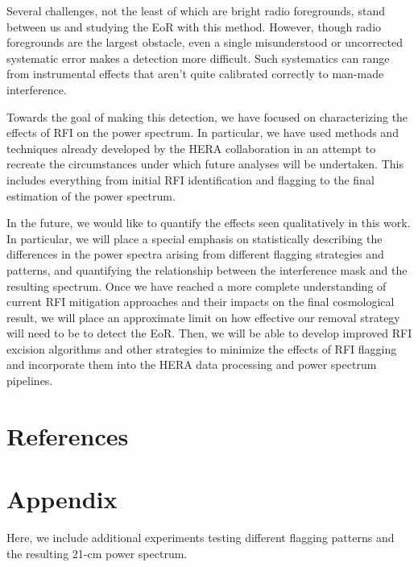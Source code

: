 \documentclass[12pt]{article}
\begin{document}
Several challenges, not the least of which are bright radio foregrounds, stand between us and studying the EoR with this method. However, though radio foregrounds are the largest obstacle, even a single misunderstood or uncorrected systematic error makes a detection more difficult. Such systematics can range from instrumental effects that aren't quite calibrated correctly to man-made interference.

Towards the goal of making this detection, we have focused on characterizing the effects of RFI on the power spectrum. In particular, we have used methods and techniques already developed by the HERA collaboration in an attempt to recreate the circumstances under which future analyses will be undertaken. This includes everything from initial RFI identification and flagging to the final estimation of the power spectrum.

In the future, we would like to quantify the effects seen qualitatively in this work. In particular, we will place a special emphasis on statistically describing the differences in the power spectra arising from different flagging strategies and patterns, and quantifying the relationship between the interference mask and the resulting spectrum. Once we have reached a more complete understanding of current RFI mitigation approaches and their impacts on the final cosmological result, we will place an approximate limit on how effective our removal strategy will need to be to detect the EoR. Then, we will be able to develop improved RFI excision algorithms and other strategies to minimize the effects of RFI flagging and incorporate them into the HERA data processing and power spectrum pipelines. \vspace{3mm}

\tocless\section{\hypertarget{references}{References}}



\newpage
\tocless\section{\hypertarget{appendix}{Appendix}}

Here, we include additional experiments testing different flagging patterns and the resulting 21-cm power spectrum.
\end{document}
